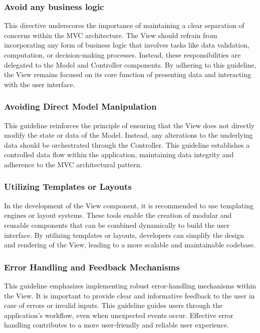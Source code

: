 \subsubsection{Avoid any business logic}
This directive underscores the importance of maintaining a clear separation of concerns within the MVC architecture. The View should refrain from incorporating any form of business logic that involves tasks like data validation, computation, or decision-making processes. Instead, these responsibilities are delegated to the Model and Controller components. By adhering to this guideline, the View remains focused on its core function of presenting data and interacting with the user interface.

\subsubsection{Avoiding Direct Model Manipulation}
This guideline reinforces the principle of ensuring that the View does not directly modify the state or data of the Model. Instead, any alterations to the underlying data should be orchestrated through the Controller. This guideline establishes a controlled data flow within the application, maintaining data integrity and adherence to the MVC architectural pattern.

\subsubsection{Utilizing Templates or Layouts}
In the development of the View component, it is recommended to use templating engines or layout systems. These tools enable the creation of modular and reusable components that can be combined dynamically to build the user interface. By utilizing templates or layouts, developers can simplify the design and rendering of the View, leading to a more scalable and maintainable codebase.

\subsubsection{Error Handling and Feedback Mechanisms}
This guideline emphasizes implementing robust error-handling mechanisms within the View. It is important to provide clear and informative feedback to the user in case of errors or invalid inputs. This guideline guides users through the application's workflow, even when unexpected events occur. Effective error handling contributes to a more user-friendly and reliable user experience.

